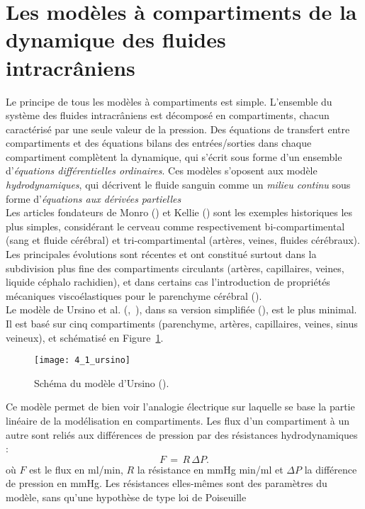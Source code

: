 \section{Les modèles à compartiments de la dynamique des fluides intracrâniens}
\label{sec:modeles_compartiments}
Le principe de tous les modèles à compartiments est simple. L'ensemble du système des fluides
intracrâniens est décomposé en compartiments, chacun caractérisé par une seule valeur de la
pression. Des équations de transfert entre compartiments et des équations bilans des entrées/sorties
dans chaque compartiment complètent la dynamique, qui s'écrit sous forme d'un ensemble d'{\em équations différentielles ordinaires}. Ces modèles s'oposent aux modèle {\em hydrodynamiques}, qui décrivent le fluide sanguin comme un {\em milieu continu} sous forme d'{\em équations aux dérivées partielles}\\
Les articles fondateurs de Monro  (\cite{Monro2010}) et Kellie (\cite{Kellie1824}) sont les exemples historiques les plus
simples, considérant le cerveau comme respectivement bi-compartimental (sang et fluide cérébral) et
tri-compartimental (artères, veines, fluides cérébraux). Les principales évolutions sont récentes et ont
constitué surtout dans la subdivision plus fine des compartiments circulants (artères, capillaires,
veines, liquide céphalo rachidien), et dans certains cas l'introduction de propriétés mécaniques
viscoélastiques pour le parenchyme cérébral (\cite{Sorek1988}).\\
Le modèle de Ursino et al. (\cite{Ursino1988},~\cite{Ursino1991}), dans sa version simplifiée (\cite{Ursino1997}), est le plus minimal. Il est
basé sur cinq compartiments (parenchyme, artères, capillaires, veines, sinus veineux), et schématisé
en Figure~\ref{fig:4_1_ursino}. 
\begin{figure}[!t]
\centering
\texttt{[image: 4\_1\_ursino]}
\caption{Schéma du modèle d'Ursino (\cite{Ursino1997}).}
\label{fig:4_1_ursino}	
\end{figure}
Ce modèle permet de bien voir l'analogie électrique sur laquelle se base la partie linéaire de la
modélisation en compartiments. Les flux d'un compartiment à un autre sont reliés aux différences de
pression par des résistances hydrodynamiques :
\begin{equation}
F\,=\,R\,\Delta P.
\end{equation}
où $F$ est le flux en ml/min, $R$ la résistance en mmHg min/ml et $\Delta P$ la différence de pression en mmHg.
Les résistances elles-mêmes sont des paramètres du modèle, sans qu'une hypothèse de type loi de Poiseuille
